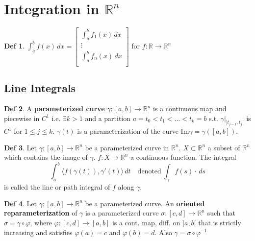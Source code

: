 \documentclass[a4paper, 10pt]{article}
\theoremstyle{definition}
\newtheorem*{definition}{Def}
\newcommand{\R}{\mathbb{R}}
\begin{document}
\section{Integration in \(\R^n\)}
\begin{definition}
    \(\int_a^b f(x) \, dx = \begin{bmatrix}
        \int_a^b f_1(x) \, dx \\
        \vdots \\
        \int_a^b f_n(x) \, dx \\
    \end{bmatrix}\) for \(f: \R \to \R^n\)
\end{definition}

\subsection{Line Integrals}
\begin{definition}
    A \textbf{parameterized curve} \(\gamma: [a, b] \to \R^n\) is a continuous map and piecewise in \(C^1\) i.e. \(\exists k > 1\) and a partition \(a = t_0 < t_1 < \ldots < t_k = b\) s.t. \(\gamma \big|_{]t_{j-1}, t_j[}\) is \(C^1\) for \(1 \leq j \leq k\). \(\gamma(t)\) is a parameterization of the curve \(\text{Im} \gamma = \gamma([a, b])\).
\end{definition}

\begin{definition}
    Let \(\gamma: [a, b] \to \R^n\) be a parameterized curve in \(\R^n\). \(X \subset \R^n\) a subset of \(\R^n\) which contains the image of \(\gamma\). \(f: X \to \R^n\) a continuous function. The integral
    \[\int_a^b \langle f(\gamma(t)), \gamma'(t)\rangle \, dt \quad \text{denoted} \ \int_\gamma f(s) \cdot \, ds\]
    is called the line or path integral of \(f\) along \(\gamma\).
\end{definition}

\begin{definition}
    Let \(\gamma: [a, b] \to \R^n\) be a parameterized curve. An \textbf{oriented reparameterization} of \(\gamma\) is a parameterized curve \(\sigma: [c, d] \to \R^n\) such that \(\sigma = \gamma \circ \varphi\), where \(\varphi: [c, d] \to [a, b]\) is a cont. map, diff. on \(]a, b[\) that is strictly increasing and satisfies \(\varphi(a) = c\) and \(\varphi(b) = d\). Also \(\gamma = \sigma \circ \varphi^{-1}\)
\end{definition}
\end{document}
